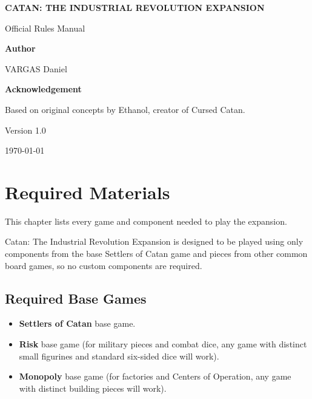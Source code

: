 \documentclass[12pt]{report}
\begin{document}
\hypersetup{pageanchor=false}
\begin{titlepage}
  \centering
  \vspace*{2.5cm}

  {\Huge \textbf{CATAN: THE INDUSTRIAL REVOLUTION EXPANSION} \par}
  \vspace{0.75cm}
  {\Large Official Rules Manual \par}

  \vspace{2cm}

  {\large \textbf{Author} \par}
  {\Large VARGAS Daniel \par}

  \vspace{0.75cm}

  {\large \textbf{Acknowledgement} \par}
  {\normalsize Based on original concepts by Ethanol, creator of Cursed Catan.\par}

  \vfill

  {\normalsize Version 1.0 \par}
  {\normalsize \today \par}

  \vspace{1.2cm}

\end{titlepage}
\clearpage
\hypersetup{pageanchor=true}

\tableofcontents
\clearpage
{}

\chapter{Required Materials}

This chapter lists every game and component needed to play the expansion.

Catan: The Industrial Revolution Expansion is designed to be played using only components from the base Settlers of Catan game and pieces from other common board games, so no custom components are required.

\section*{Required Base Games}
\begin{itemize}[leftmargin=1.2cm]
  \item \textbf{Settlers of Catan} base game.
  \item \textbf{Risk} base game (for military pieces and combat dice, any game with distinct small figurines and standard six-sided dice will work).
  \item \textbf{Monopoly} base game (for factories and Centers of Operation, any game with distinct building pieces will work).
\end{itemize}
\end{document}
